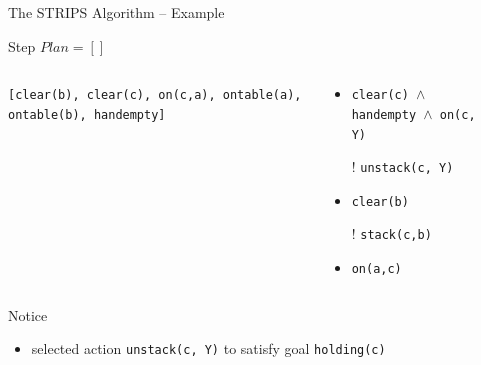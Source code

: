 \documentclass[presentation]{beamer}\mode<presentation>{\usetheme{AMSBolognaFC}}
\begin{document}
\begin{frame}[c]{The STRIPS Algorithm -- Example}
\small

	\begin{exampleblock}{Step \nextStripsExampleStep{} \hfill $Plan = []$}
		\begin{columns}[t]
			\begin{column}{.30\linewidth}\centering
				\texttt{[clear(b), clear(c), on(c,a), ontable(a), ontable(b), handempty]}
			\end{column}
			\begin{column}{.50\linewidth}\centering
				\begin{itemize}
					\item \texttt{clear(c) $\wedge$ handempty $\wedge$ on(c, Y)}
					\item[!] \texttt{unstack(c, Y)}
					\item \texttt{clear(b)}
					\item[!] \texttt{stack(c,b)}
					\item \texttt{on(a,c)}
				\end{itemize}
			\end{column}
			\begin{column}{.10\linewidth}\centering
				
			\end{column}
		\end{columns}
	\end{exampleblock}

	\vfill

	\footnotesize
	Notice
	\begin{itemize}\tiny
	    \item selected action \texttt{unstack(c, Y)} to satisfy goal \texttt{holding(c)}
	\end{itemize}

\end{frame}
\end{document}
